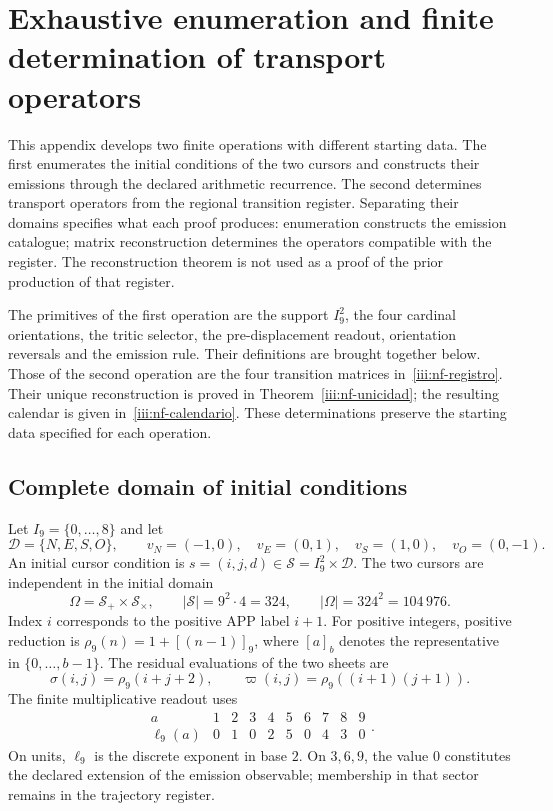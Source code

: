 \section{Exhaustive enumeration and finite determination of transport operators}
\label{iii:nucleo-finito}

This appendix develops two finite operations with different starting
data. The first enumerates the initial conditions of the two cursors
and constructs their emissions through the declared arithmetic recurrence.
The second determines transport operators from the regional
transition register. Separating their domains specifies
what each proof produces: enumeration constructs the emission
catalogue; matrix reconstruction determines the operators compatible
with the register. The reconstruction theorem is not used as a proof
of the prior production of that register.

The primitives of the first operation are the support $I_9^2$, the four
cardinal orientations, the tritic selector, the pre-displacement readout,
orientation reversals and the emission rule.
Their definitions are brought together below. Those of the second operation are the
four transition matrices in~\eqref{iii:nf-registro}.
Their unique reconstruction is proved in
Theorem~\ref{iii:nf-unicidad}; the resulting calendar is given
in~\eqref{iii:nf-calendario}. These determinations preserve
the starting data specified for each operation.

\subsection{Complete domain of initial conditions}

Let $I_9=\{0,\ldots,8\}$ and let
\[
 \mathcal D=\{N,E,S,O\},\qquad
 v_N=(-1,0),\quad v_E=(0,1),\quad
 v_S=(1,0),\quad v_O=(0,-1).
\]
An initial cursor condition is $s=(i,j,d)\in
\mathcal S=I_9^2\times\mathcal D$. The two cursors are independent
in the initial domain
\begin{equation}
 \Omega=\mathcal S_+\times\mathcal S_\times,
 \qquad |\mathcal S|=9^2\cdot4=324,
 \qquad |\Omega|=324^2=104\,976.
 \label{iii:nf-dominio}
\end{equation}
Index $i$ corresponds to the positive APP label $i+1$. For
positive integers, positive reduction is $\rho_9(n)=1+[(n-1)]_9$,
where $[a]_b$ denotes the representative in $\{0,\ldots,b-1\}$.
The residual evaluations of the two sheets are
\[
 \sigma(i,j)=\rho_9(i+j+2),\qquad
 \varpi(i,j)=\rho_9((i+1)(j+1)).
\]
The finite multiplicative readout uses
\begin{equation}
 \begin{array}{c|rrrrrrrrr}
 a&1&2&3&4&5&6&7&8&9\\ \hline
 \ell_9(a)&0&1&0&2&5&0&4&3&0
 \end{array}.
 \label{iii:nf-log}
\end{equation}
On units, $\ell_9$ is the discrete exponent in base $2$.
On $3,6,9$, the value $0$ constitutes the declared extension of the
emission observable; membership in that sector remains in the
trajectory register.

